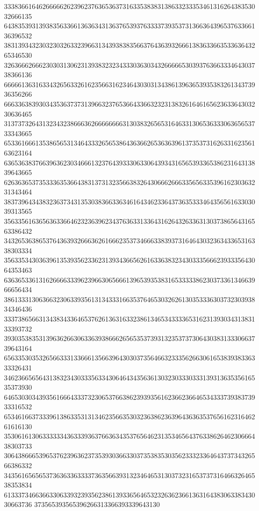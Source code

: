 33383661646266666262396237636536373163353838313863323335346131626438353032666135
64383539313938356336613636343136376539376333373935373136636439653763366136396532
38313934323032303263323966313439383835663764363932666138363366353363643265346530
32636662666230303130623139383232343330363034326666653039376366333464303738366136
66666136316334326563326162356631623464303031343861396365393538326134373936356266
66633638393034353637373139663237653664336632323138326164616562363364303230636465
31373732643132343238666362666666663130383265653164633130653633306365653733343665
65336166613538656531346433326565386436366265363639613735373162633162356163623164
63653638376639636230346661323764393330633064393431656539336538623164313839643665
62636365373533363536643831373132356638326430666266633565633539616230363231343464
38373964343832363734313530383663363461643462336437363533346435656163303039313565
35633561636563633664623236396234376363313364316264326336313037386564316563386432
34326536386537643639326663626166623537346663383937316464303236343365316338303334
35633534303639613539356233623139343665626163363832343033356662393335643064353463
63636533613162666633396239663065666139653935383165333338623037336134663966656434
38613331306366323063393561313433316635376465303262613035333630373230393834346436
33373865663134383433646537626136316332386134653433336531623139303431383133393732
39303538353139636266306336393866626565353739313235373730643038313330663739643164
65633530353265663331336661356639643030373564663233356266306165383938336333326431
34623665656431383234303335633430646434356361303230333033313931363535616535373930
64653030343935616664333732306537663862393935616236623664653433373938373933316532
65346166373339613863353131346235663530323638623639643636353765616231646261616130
35306161306333333436333936376636343537656462313534656437633862646230666438303733
30643866653965376239636237353930366330373538353035623332336464373734326566386332
34356165656537363633633337363566393132346465313037323165373731646632646538353834
61333734663663306339323935623861393365646532326362366136316438306338343030663736
373565393565396266313366393339643130
